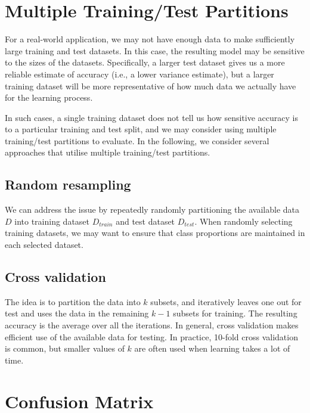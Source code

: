 \section{Multiple Training/Test Partitions}

For a real-world application, we may not have enough data to make sufficiently large training and test datasets. In this case, the resulting model may be sensitive to the sizes of the datasets. Specifically, a larger test dataset gives us a more reliable estimate of accuracy (i.e., a lower variance estimate), but a larger training dataset will be more representative of how much data we actually have for the learning process. 

In such cases, a single training dataset does not tell us how sensitive accuracy is to a particular training and test split, and we may consider using multiple training/test partitions to evaluate. In the following, we consider several approaches that utilise multiple training/test partitions. 

\subsection*{Random resampling}

We can address the issue by repeatedly randomly partitioning the available data $D$ into training dataset $D_{train}$ and test dataset $D_{test}$. 
%
When randomly selecting training datasets, we may want to ensure that class proportions are maintained in each selected dataset.

\subsection*{Cross validation}

The idea is to partition the data into $k$ subsets, and iteratively leaves one out for test and uses the data in the remaining $k-1$ subsets for training. The resulting accuracy is the average over all the iterations. In general, cross validation makes efficient use of the available data for testing. 
%
In practice, 10-fold cross validation is common, but smaller values of $k$ are often used when learning takes a lot of time.  



\section{Confusion Matrix}\label{sec:confusionmatrix}

